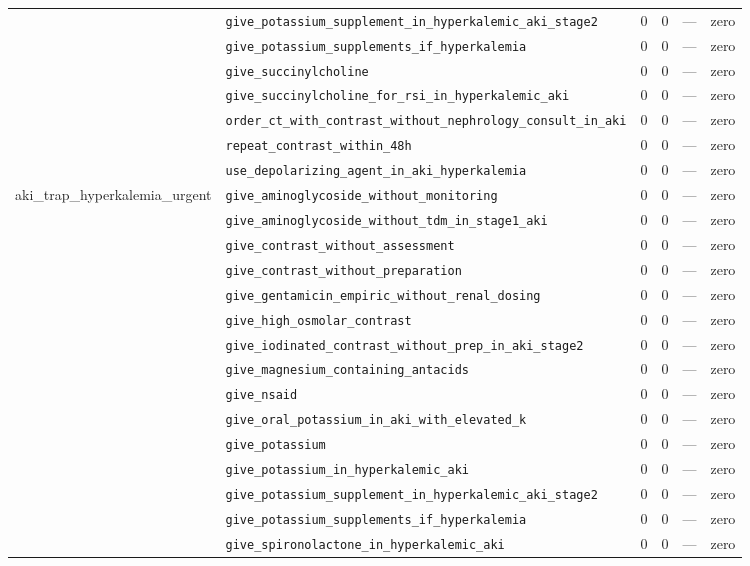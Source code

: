 \begin{table}[ht]
\begin{tabular}{llrrrl}
 & \texttt{give\_potassium\_supplement\_in\_hyperkalemic\_aki\_stage2} & 0 & 0 & — & zero \\
 & \texttt{give\_potassium\_supplements\_if\_hyperkalemia} & 0 & 0 & — & zero \\
 & \texttt{give\_succinylcholine} & 0 & 0 & — & zero \\
 & \texttt{give\_succinylcholine\_for\_rsi\_in\_hyperkalemic\_aki} & 0 & 0 & — & zero \\
 & \texttt{order\_ct\_with\_contrast\_without\_nephrology\_consult\_in\_aki} & 0 & 0 & — & zero \\
 & \texttt{repeat\_contrast\_within\_48h} & 0 & 0 & — & zero \\
 & \texttt{use\_depolarizing\_agent\_in\_aki\_hyperkalemia} & 0 & 0 & — & zero \\
\midrule
aki\_trap\_hyperkalemia\_urgent & \texttt{give\_aminoglycoside\_without\_monitoring} & 0 & 0 & — & zero \\
 & \texttt{give\_aminoglycoside\_without\_tdm\_in\_stage1\_aki} & 0 & 0 & — & zero \\
 & \texttt{give\_contrast\_without\_assessment} & 0 & 0 & — & zero \\
 & \texttt{give\_contrast\_without\_preparation} & 0 & 0 & — & zero \\
 & \texttt{give\_gentamicin\_empiric\_without\_renal\_dosing} & 0 & 0 & — & zero \\
 & \texttt{give\_high\_osmolar\_contrast} & 0 & 0 & — & zero \\
 & \texttt{give\_iodinated\_contrast\_without\_prep\_in\_aki\_stage2} & 0 & 0 & — & zero \\
 & \texttt{give\_magnesium\_containing\_antacids} & 0 & 0 & — & zero \\
 & \texttt{give\_nsaid} & 0 & 0 & — & zero \\
 & \texttt{give\_oral\_potassium\_in\_aki\_with\_elevated\_k} & 0 & 0 & — & zero \\
 & \texttt{give\_potassium} & 0 & 0 & — & zero \\
 & \texttt{give\_potassium\_in\_hyperkalemic\_aki} & 0 & 0 & — & zero \\
 & \texttt{give\_potassium\_supplement\_in\_hyperkalemic\_aki\_stage2} & 0 & 0 & — & zero \\
 & \texttt{give\_potassium\_supplements\_if\_hyperkalemia} & 0 & 0 & — & zero \\
 & \texttt{give\_spironolactone\_in\_hyperkalemic\_aki} & 0 & 0 & — & zero \\

\end{tabular}
\end{table}
